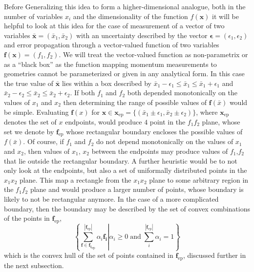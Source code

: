 Before Generalizing this idea to form a higher-dimensional analogue, both in the number of variables $x_i$ and the dimensionality of the function $f(\mathbf{x})$ it will be helpful to look at this idea for the case of measurement of a vector of two variables $\bar{\mathbf{x}} = (\bar{x}_1, \bar{x}_2)$ with an uncertainty described by the vector $\bm{\epsilon} = (\epsilon_1, \epsilon_2)$ and error propagation through a vector-valued function of two variables $\mathbf{f}(\mathbf{x}) = (f_1, f_2)$. We will treat the vector-valued function as non-parametrix or as a ``black box'' as the function mapping momentum measurements to geometries cannot be parameterized or given in any analytical form. In this case the true value of $\bar{\mathbf{x}}$ lies within a box described by $\bar{x}_1 - \epsilon_1 \le \bar{x}_1 \le \bar{x}_1 + \epsilon_1$ and $\bar{x}_2 - \epsilon_2 \le \bar{x}_2 \le \bar{x}_2 + \epsilon_2$. If both $f_1$ and $f_2$ both depended monotonically on the values of $x_1$ and $x_2$ then determining the range of possible values of $\mathbf{f}(\bar{x})$ would be simple. Evaluating $\mathbf{f}(x)$ for $\mathbf{x} \in \mathbf{x}_\mathrm{ep} = \lbrace (\bar{x}_1 \pm \epsilon_1, \bar{x}_2 \pm \epsilon_2) \rbrace$, where $\mathbf{x}_\mathrm{ep}$ denotes the set of $x$ endpoints, would produce $4$ point in the $f_1f_2$ plane, whose set we denote by $\mathbf{f}_\mathrm{ep}$ whose rectangular boundary encloses the possible values of $f(\bar{x})$. Of course, if $f_1$ and $f_2$ do not depend monotonically on the values of $x_1$ and $x_2$, then values of $x_1$, $x_2$ between the endpoints may produce values of $f_1$,$f_2$ that lie outside the rectangular boundary. A further heuristic would be to not only look at the endpoints, but also a set of uniformally distributed points in the $x_1x_2$ plane. This map a rectangle from the $x_1x_2$ plane to some arbitrary region in the $f_1f_2$ plane and would produce a larger number of points, whose boundary is likely to not be rectangular anymore. In the case of a more complicated boundary, then the boundary may be described by the set of convex combinations of the points in $\mathbf{f}_\mathrm{ep}$,
\begin{equation}
  \displaystyle
  \left\lbrace\left.
  \sum_{\mathbf{f} \in \mathbf{f_i}_\mathrm{ep}}^{|\mathbf{f}_\mathrm{ep}|}
  \alpha_i\mathbf{f_i}
  \right| \alpha_i \ge 0 \; \mathrm{and} \;
  \sum_i^{|\mathbf{f}_\mathrm{ep}|} \alpha_i = 1
  \right\rbrace
\end{equation}
which is the convex hull of the set of points contained in $\mathbf{f}_\mathrm{ep}$, discussed further in the next subsection.

